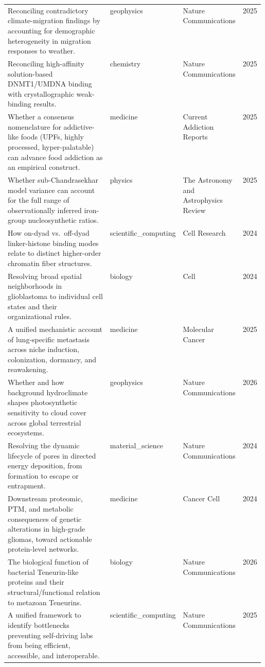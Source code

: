 \begin{landscape}
\begin{longtable}{@{}p{0.58\linewidth} l l c@{}}
\addlinespace
Reconciling contradictory climate-migration findings by accounting for demographic heterogeneity in migration responses to weather. & geophysics & Nature Communications & 2025 \\
\addlinespace
Reconciling high-affinity solution-based DNMT1/UMDNA binding with crystallographic weak-binding results. & chemistry & Nature Communications & 2025 \\
\addlinespace
Whether a consensus nomenclature for addictive-like foods (UPFs, highly processed, hyper-palatable) can advance food addiction as an empirical construct. & medicine & Current Addiction Reports & 2025 \\
\addlinespace
Whether sub-Chandrasekhar model variance can account for the full range of observationally inferred iron-group nucleosynthetic ratios. & physics & The Astronomy and Astrophysics Review & 2025 \\
\addlinespace
How on-dyad vs.\ off-dyad linker-histone binding modes relate to distinct higher-order chromatin fiber structures. & scientific\_computing & Cell Research & 2024 \\
\addlinespace
Resolving broad spatial neighborhoods in glioblastoma to individual cell states and their organizational rules. & biology & Cell & 2024 \\
\addlinespace
A unified mechanistic account of lung-specific metastasis across niche induction, colonization, dormancy, and reawakening. & medicine & Molecular Cancer & 2025 \\
\addlinespace
Whether and how background hydroclimate shapes photosynthetic sensitivity to cloud cover across global terrestrial ecosystems. & geophysics & Nature Communications & 2026 \\
\addlinespace
Resolving the dynamic lifecycle of pores in directed energy deposition, from formation to escape or entrapment. & material\_science & Nature Communications & 2024 \\
\addlinespace
Downstream proteomic, PTM, and metabolic consequences of genetic alterations in high-grade gliomas, toward actionable protein-level networks. & medicine & Cancer Cell & 2024 \\
\addlinespace
The biological function of bacterial Teneurin-like proteins and their structural/functional relation to metazoan Teneurins. & biology & Nature Communications & 2026 \\
\addlinespace
A unified framework to identify bottlenecks preventing self-driving labs from being efficient, accessible, and interoperable. & scientific\_computing & Nature Communications & 2025 \\

\end{longtable}
\end{landscape}
